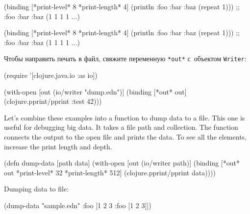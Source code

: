\begin{english}
  \begin{clojure}
(binding [*print-level* 8
          *print-length* 4]
  (println
    {:foo {:bar {:baz (repeat 1)}}}))
;; {:foo {:bar {:baz (1 1 1 1 ...)}}}
  \end{clojure}
\end{english}

\else

\begin{english}
  \begin{clojure}
(binding [*print-level* 8
          *print-length* 4]
  (println {:foo {:bar {:baz (repeat 1)}}}))
;; {:foo {:bar {:baz (1 1 1 1 ...)}}}
  \end{clojure}
\end{english}

\fi


Чтобы направить печать в файл, свяжите переменную \verb|*out*| с~объектом
\verb|Writer|:

\begin{english}
  \begin{clojure}
(require '[clojure.java.io :as io])

(with-open [out (io/writer "dump.edn")]
  (binding [*out* out]
    (clojure.pprint/pprint {:test 42})))
  \end{clojure}
\end{english}

Let's combine these examples into a function to dump data to a file.
This one is useful for debugging big data.
It takes a file path and collection.
The function connects the output to the open file and prints the data.
To see all the elements, increase the print length and depth.

\begin{english}
  \begin{clojure}
(defn dump-data
  [path data]
  (with-open [out (io/writer path)]
    (binding [*out* out
              *print-level* 32
              *print-length* 512]
      (clojure.pprint/pprint data))))
  \end{clojure}
\end{english}

\noindent
Dumping data to file:

\ifx\DEVICETYPE\MOBILE

\begin{english}
  \begin{clojure}
(dump-data "sample.edn"
  {:foo [1 2 3 {:foo [1 2 3]}]})
  \end{clojure}
\end{english}

